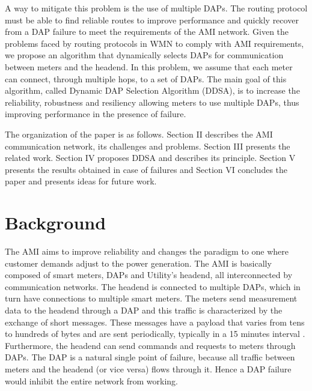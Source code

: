 \documentclass[conference]{IEEEtran}
\begin{document}
A way to mitigate this problem is the use of multiple DAPs. The routing protocol must be able to find reliable routes to improve performance and quickly recover from a DAP failure to meet the requirements of the AMI network. Given the problems faced by routing protocols in WMN to comply with AMI requirements, we propose an algorithm that dynamically selects DAPs for communication between meters and the headend. In this problem, we assume that each meter can connect, through multiple hops, to a set of DAPs. The main goal of this algorithm, called Dynamic DAP Selection Algorithm (DDSA), is to increase the reliability, robustness and resiliency allowing meters to use multiple DAPs, thus improving performance in the presence of failure.

The organization of the paper is as follows. Section II describes the AMI communication network, its challenges and problems. Section III presents the related work. Section IV proposes DDSA and describes its principle. Section V presents the results obtained in case of failures and Section VI concludes the paper and presents ideas for future work.

\section{Background}


The AMI aims to improve reliability and  changes the paradigm  to one where customer demands adjust to the power generation. The AMI is basically composed of smart meters, DAPs and Utility's headend, all interconnected by communication networks. 
The headend is connected to multiple DAPs, which in turn have connections to  multiple smart meters.
The meters send measurement data to the headend through a DAP and this traffic is characterized by the exchange of short messages. These messages have a payload that varies from tens to hundreds of bytes and are sent periodically, typically in a 15 minutes interval \cite{4547164,SRS:13}. Furthermore, the headend can send commands and requests to meters through DAPs. The DAP is a natural single point of failure, because all traffic between meters and the headend (or vice versa) flows through it. Hence a DAP failure would inhibit the entire network from working.
\end{document}
